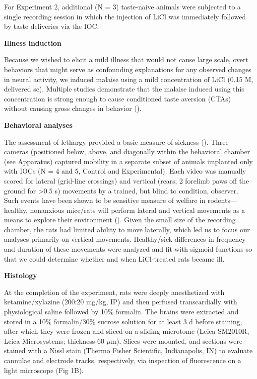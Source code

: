 \begin{refsection}
For Experiment 2, additional (N = 3) taste-naive animals were subjected to a single recording session in which the injection of LiCl was immediately followed by taste deliveries via the IOC.

\smallskip
\noindent\textbf{Illness induction}\par
\noindent 
Because we wished to elicit a mild illness that would not cause large scale, overt behaviors that might serve as confounding explanations for any observed changes in neural activity, we induced malaise using a mild concentration of LiCl (0.15 M, delivered sc). Multiple studies demonstrate that the malaise induced using this concentration is strong enough to cause conditioned taste aversion (CTAs) without causing gross changes in behavior (\cite{nachman1973a,smith1971a}).

\smallskip
\noindent\textbf{Behavioral analyses}\par
\noindent 
The assessment of lethargy provided a basic measure of sickness (\cite{parker1982a,kent1992a}). Three cameras (positioned below, above, and diagonally within the behavioral chamber (see Apparatus) captured mobility in a separate subset of animals implanted only with IOCs (N = 4 and 5, Control and Experimental). Each video was manually scored for lateral (grid-line crossings) and vertical (rears; 2 forelimb paws off the ground for >0.5 s) movements by a trained, but blind to condition, observer. Such events have been shown to be sensitive measure of welfare in rodents—healthy, nonanxious mice/rats will perform lateral and vertical movements as a means to explore their environment (\cite{nachman1975a,cross-mellor2009a}). Given the small size of the recording chamber, the rats had limited ability to move laterally, which led us to focus our analyses primarily on vertical movements. Healthy/sick differences in frequency and duration of these movements were analyzed and fit with sigmoid functions so that we could determine whether and when LiCl-treated rats became ill.

\smallskip
\noindent\textbf{Histology}\par
\noindent 
At the completion of the experiment, rats were deeply anesthetized with ketamine/xylazine (200:20 mg/kg, IP) and then perfused transcardially with physiological saline followed by 10\% formalin. The brains were extracted and stored in a 10\% formalin/30\% sucrose solution for at least 3 d before staining, after which they were frozen and sliced on a sliding microtome (Leica SM2010R, Leica Microsystems; thickness 60 \(\mu\)m). Slices were mounted, and sections were stained with a Nissl stain (Thermo Fisher Scientific, Indianapolis, IN) to evaluate cannulae and electrode tracks, respectively, via inspection of fluorescence on a light microscope (Fig 1B).


\end{refsection}
